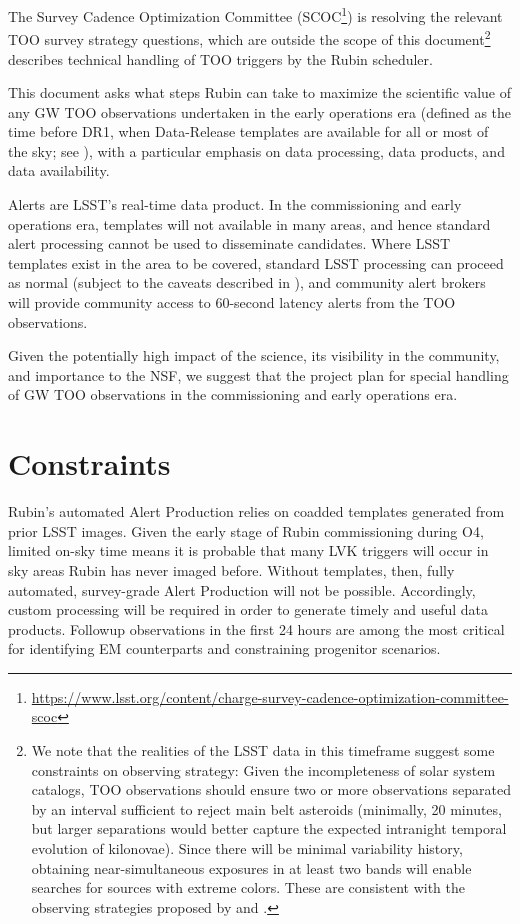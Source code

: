 \documentclass[DM,authoryear,toc]{lsstdoc}
\begin{document}
The Survey Cadence Optimization Committee (SCOC\footnote{\url{https://www.lsst.org/content/charge-survey-cadence-optimization-committee-scoc}}) is resolving the relevant TOO survey strategy questions, which are outside the scope of this document\footnote{We note that the realities of the LSST data in this timeframe suggest some constraints on observing strategy:  
Given the incompleteness of solar system catalogs, TOO observations should ensure two or more observations separated by an interval sufficient to reject main belt asteroids (minimally, 20 minutes, but larger separations would better capture the expected intranight temporal evolution of kilonovae).  
Since there will be minimal variability history, obtaining near-simultaneous exposures in at least two bands will enable searches for sources with extreme colors.  
These are consistent with the observing strategies proposed by \citet{2018arXiv181204051M} and \citet{2022ApJS..260...18A}.} 
 describes technical handling of TOO triggers by the Rubin scheduler.

This document asks what steps Rubin can take to maximize the scientific value of any GW TOO observations undertaken in the early operations era (defined as the time before DR1, when Data-Release templates are available for all or most of the sky; see ), with a particular emphasis on data processing, data products, and data availability.

Alerts are LSST's real-time data product.  
In the commissioning and early operations era, 
templates will not available in many areas, and hence standard alert processing cannot be used to disseminate candidates.
Where LSST templates exist in the area to be covered, standard LSST processing can proceed as normal (subject to the caveats described in ), and community alert brokers will provide community access to 60-second latency alerts from the TOO observations.

Given the potentially high impact of the science, its visibility in the community, and importance to the NSF, we suggest that the project plan for special handling of GW TOO observations in the commissioning and early operations era.  

\section{Constraints} \label{sec:constraints}

Rubin's automated Alert Production relies on coadded templates generated from prior LSST images.  
Given the early stage of Rubin commissioning during O4, limited on-sky time means it is probable that many LVK triggers will occur in sky areas Rubin has never imaged before.
Without templates, then, fully automated, survey-grade Alert Production will not be possible. 
Accordingly, custom processing will be required in order to generate timely and useful data products.
Followup observations in the first 24 hours are among the most critical for identifying EM counterparts and constraining progenitor scenarios. 
\end{document}
